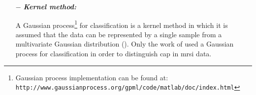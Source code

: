 \begin{enumerate}[leftmargin=*]
\item[$-$] \textbf{\textit{Kernel method:}}

A Gaussian process\footnote{Gaussian process implementation can be found at: \texttt{http://www.\allowbreak gaussianprocess.org/gpml/code/matlab/doc/index.html}} for classification is a kernel method in which it is assumed that the data can be represented by a single sample from a multivariate Gaussian distribution (\cite{Rasmussen2005}). %
%
%
%
%
%
%
%
Only the work of \cite{Kelm2007} used a Gaussian process for classification in order to distinguish \ac{cap} in \ac{mrsi} data.


\end{enumerate}
